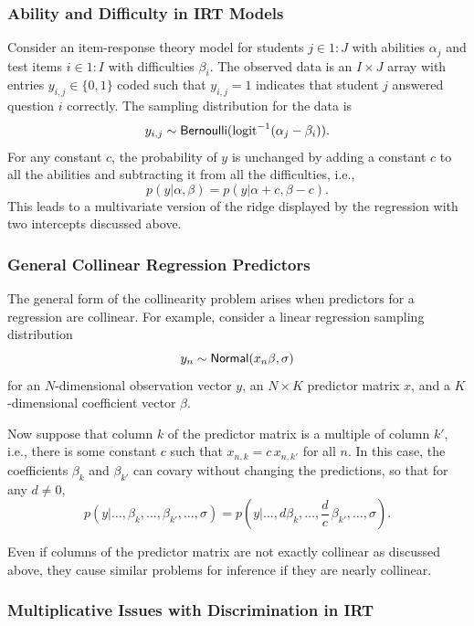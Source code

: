 \subsubsection{Ability and Difficulty in IRT Models}

Consider an item-response theory model for students $j \in 1{:}J$ with
abilities $\alpha_j$ and test items $i \in 1{:}I$ with difficulties
$\beta_i$.  The observed data is an $I \times J$ array with entries
$y_{i, j} \in \{ 0, 1 \}$ coded such that $y_{i, j} = 1$ indicates that
student $j$ answered question $i$ correctly.  The sampling
distribution for the data is
%
\[
y_{i, j} \sim \distro{Bernoulli}(\mbox{logit}^{-1}(\alpha_j - \beta_i)).
\]
%
For any constant $c$, the probability of $y$ is unchanged by adding a
constant $c$ to all the abilities and subtracting it from all the
difficulties, i.e.,
%
\[
p(y | \alpha, \beta)
= 
p(y | \alpha + c, \beta - c).
\]
%
This leads to a multivariate version of the ridge displayed by the
regression with two intercepts discussed above.

\subsubsection{General Collinear Regression Predictors}

The general form of the collinearity problem arises when predictors
for a regression are collinear.  For example, consider a linear
regression sampling distribution
\[
y_n \sim \distro{Normal}(x_n \beta, \sigma)
\]
for an $N$-dimensional observation vector $y$, an $N \times K$ predictor
matrix $x$, and a $K$-dimensional coefficient vector $\beta$.

Now suppose that column $k$ of the predictor matrix is a multiple of
column $k'$, i.e., there is some constant $c$ such that $x_{n,k} = c
\, x_{n,k'}$ for all $n$.  In this case, the coefficients $\beta_k$
and $\beta_{k'}$ can covary without changing the predictions, so that
for any $d \neq 0$,
%
\[
p(y | \ldots, \beta_k, \ldots, \beta_{k'}, \ldots, \sigma)
=
p(y | \ldots, d  \beta_k, \ldots, \frac{d}{c} \, \beta_{k'}, \ldots,
\sigma).
\]

Even if columns of the predictor matrix are not exactly collinear as
discussed above, they cause similar problems for inference if they are
nearly collinear.


\subsubsection{Multiplicative Issues with Discrimination in IRT}

